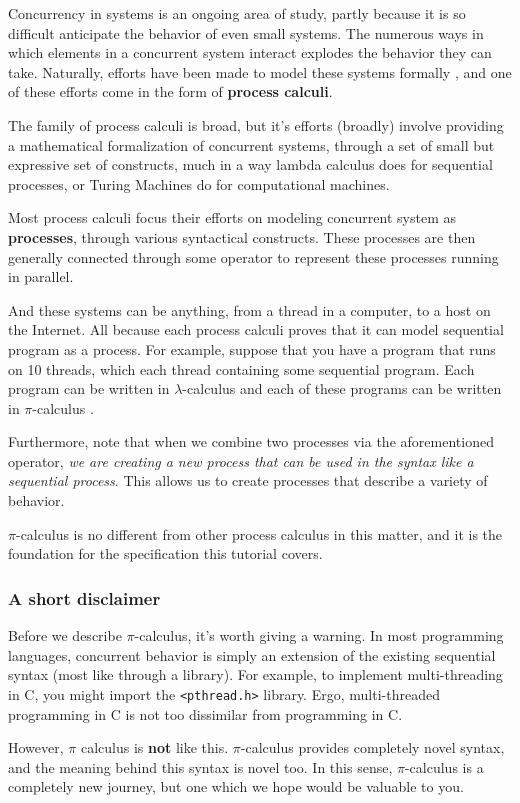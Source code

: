 Concurrency in systems is an ongoing area of study, partly because it is so difficult anticipate the behavior of even small systems. The numerous ways in which elements in a concurrent system interact explodes the behavior they can take. Naturally, efforts have been made to model these systems formally , and one of these efforts come in the form of \textbf{process calculi}.

The family of process calculi is broad, but it's efforts (broadly) involve providing a mathematical formalization of concurrent systems, through a set of small but expressive set of constructs, much in a way lambda calculus does for sequential processes, or Turing Machines do for computational machines.

Most process calculi focus their efforts on modeling concurrent system as \textbf{processes}, through various syntactical constructs. These processes are then generally connected through some operator to represent these processes running in parallel. 

And these systems can be anything, from a thread in a computer, to a host on the Internet. All because each process calculi proves that it can model sequential program as a process. For example, suppose that you have a program that runs on 10 threads, which each thread containing some sequential program. Each program can be written in $\lambda$-calculus  and each of these programs can be written in $\pi$-calculus .

Furthermore, note that when we combine two processes via the aforementioned operator, \textit{we are creating a new process that can be used in the syntax like a sequential process}. This allows us to create processes that describe a variety of behavior.

$\pi$-calculus is no different from other process calculus in this matter, and it is the foundation for the specification this tutorial covers. 

\subsubsection{A short disclaimer}

Before we describe $\pi$-calculus, it's worth giving a warning. In most programming languages, concurrent behavior is simply an extension of the existing sequential syntax (most like through a library). For example, to implement multi-threading in C, you might import the \verb`<pthread.h>` library. Ergo, multi-threaded programming in C is not too dissimilar from programming in C.

However, $\pi$ calculus is \textbf{not} like this. $\pi$-calculus provides completely novel syntax, and the meaning behind this syntax is novel too. In this sense, $\pi$-calculus is a completely new journey, but one which we hope would be valuable to you.